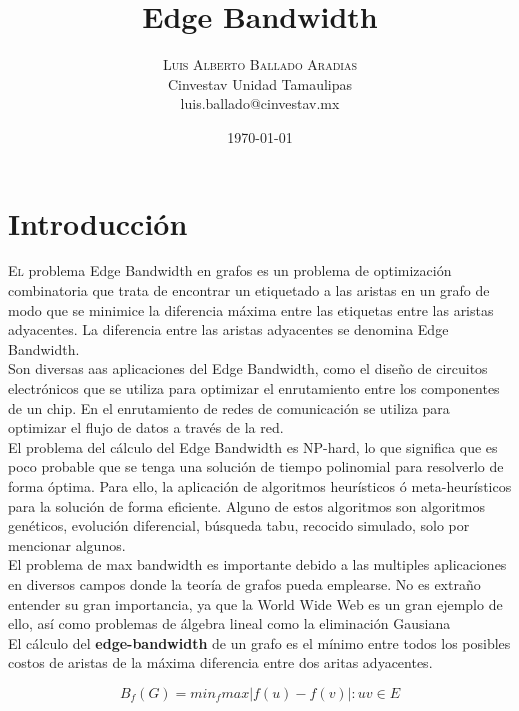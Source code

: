 \documentclass[oneside,onecolumn]{article}
\title{Edge Bandwidth} %
\author{%
\textsc{Luis Alberto Ballado Aradias} \\%
\normalsize Cinvestav Unidad Tamaulipas \\ %
\normalsize luis.ballado@cinvestav.mx %
}
\date{\today} %
\begin{document}
\maketitle

\section{Introducción}

\lettrine[nindent=0em,lines=3]{E}l problema Edge Bandwidth en grafos es un problema de optimización combinatoria que trata de encontrar un etiquetado a las aristas en un grafo de modo que se minimice la diferencia máxima entre las etiquetas entre las aristas adyacentes. La diferencia entre las aristas adyacentes se denomina Edge Bandwidth.\\

Son diversas aas aplicaciones del Edge Bandwidth, como el diseño de circuitos electrónicos que se utiliza para optimizar el enrutamiento entre los componentes de un chip. En el enrutamiento de redes de comunicación se utiliza para optimizar el flujo de datos a través de la red.\\

El problema del cálculo del Edge Bandwidth es NP-hard, lo que significa que es poco probable que se tenga una solución de tiempo polinomial para resolverlo de forma óptima. Para ello, la aplicación de algoritmos heurísticos ó meta-heurísticos para la solución de forma eficiente. Alguno de estos algoritmos son algoritmos genéticos, evolución diferencial, búsqueda tabu, recocido simulado, solo por mencionar algunos.\\

El problema de max bandwidth es importante debido a las multiples aplicaciones en diversos campos donde la teoría de grafos pueda emplearse. No es extraño entender su gran importancia, ya que la World Wide Web es un gran ejemplo de ello, así como problemas de álgebra lineal como la eliminación Gausiana\\

El cálculo del \textbf{edge-bandwidth} de un grafo es el mínimo entre todos los posibles costos de aristas de la máxima diferencia entre dos aritas adyacentes. 

\begin{center}
  \[B_f(G) = min_f {  } max{|f(u)-f(v)|: uv \in E}\]
\end{center}
\end{document}
